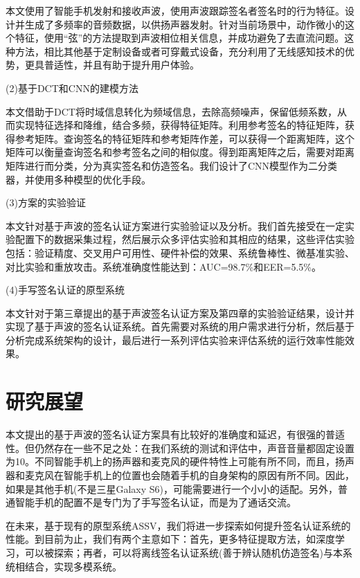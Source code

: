 本文使用了智能手机发射和接收声波，使用声波跟踪签名者签名时的行为特征。设计并生成了多频率的音频数据，以供扬声器发射。针对当前场景中，动作微小的这个特征，使用“弦”的方法提取到声波相位相关信息，并成功避免了去直流问题。这种方法，相比其他基于定制设备或者可穿戴式设备，充分利用了无线感知技术的优势，更具普适性，并且有助于提升用户体验。

(2)基于DCT和CNN的建模方法

本文借助于DCT将时域信息转化为频域信息，去除高频噪声，保留低频系数，从而实现特征选择和降维，结合多频，获得特征矩阵。利用参考签名的特征矩阵，获得参考矩阵。查询签名的特征矩阵和参考矩阵作差，可以获得一个距离矩阵，这个矩阵可以衡量查询签名和参考签名之间的相似度。得到距离矩阵之后，需要对距离矩阵进行而分类，分为真实签名和仿造签名。我们设计了CNN模型作为二分类器，并使用多种模型的优化手段。

(3)方案的实验验证

本文针对基于声波的签名认证方案进行实验验证以及分析。我们首先接受在一定实验配置下的数据采集过程，然后展示众多评估实验和其相应的结果，这些评估实验包括：验证精度、交叉用户可用性、硬件补偿的效果、系统鲁棒性、微基准实验、对比实验和重放攻击。系统准确度性能达到：AUC=98.7\%和EER=5.5\%。

(4)手写签名认证的原型系统

本文针对于第三章提出的基于声波签名认证方案及第四章的实验验证结果，设计并实现了基于声波的签名认证系统。首先需要对系统的用户需求进行分析，然后基于分析完成系统架构的设计，最后进行一系列评估实验来评估系统的运行效率性能效果。

\section{研究展望}
本文提出的基于声波的签名认证方案具有比较好的准确度和延迟，有很强的普适性。但仍然存在一些不足之处：在我们系统的测试和评估中，声音音量都固定设置为10。不同智能手机上的扬声器和麦克风的硬件特性上可能有所不同，而且，扬声器和麦克风在智能手机上的位置也会随着手机的自身架构的原因有所不同。因此，如果是其他手机(不是三星Galaxy S6)，可能需要进行一个小小的适配。另外，普通智能手机的配置不是专门为了手写签名认证，而是为了通话交流。

在未来，基于现有的原型系统ASSV，我们将进一步探索如何提升签名认证系统的性能。到目前为止，我们有两个主意如下：首先，更多特征提取方法，如深度学习，可以被探索；再者，可以将离线签名认证系统(善于辨认随机仿造签名)与本系统相结合，实现多模系统。

